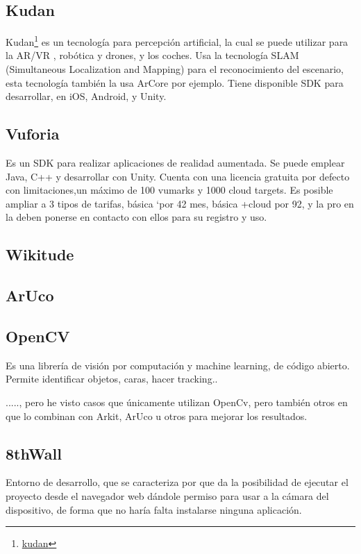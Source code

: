 \subsection{Kudan} Kudan\footnote{\href{https://www.xlsoft.com/en/products/kudan/?utm_source=google&utm_medium=adwords&utm_campaign=cp01&gclid=Cj0KCQiAvJXxBRCeARIsAMSkAprma7nGzsXVWd9w5H4HSQzNoOkF2eJu8LzAtEXbaDALYPUdfBOOgpEaAoqoEALw_wcB}{kudan}} es un tecnología para percepción artificial, la cual se puede utilizar para la AR/VR , robótica y drones, y los coches.
Usa la tecnología SLAM (Simultaneous Localization and Mapping) para el reconocimiento del escenario, esta tecnología también la usa ArCore por ejemplo.
Tiene disponible SDK para desarrollar, en iOS, Android, y Unity.

\subsection{Vuforia}
Es un SDK para realizar aplicaciones de realidad aumentada. Se puede emplear Java, C++ y desarrollar con Unity.
Cuenta con una licencia gratuita por defecto con limitaciones,un máximo de 100 vumarks y 1000 cloud targets.
Es posible ampliar a 3 tipos de tarifas, básica `por 42 mes, básica +cloud por 92, y la pro en la deben ponerse en contacto con ellos para su registro y uso.


\subsection{Wikitude}


\subsection{ArUco}


\subsection{OpenCV}
Es una librería de visión por computación y machine learning, de código abierto. Permite identificar objetos, caras, hacer tracking..

....., pero he visto casos que únicamente utilizan OpenCv, pero también otros en que lo combinan con Arkit, ArUco u otros para mejorar los resultados.


\subsection{8thWall}
Entorno de desarrollo, que se caracteriza por que da la posibilidad de ejecutar el proyecto desde el navegador web dándole permiso para usar a la cámara del dispositivo, de forma que no haría falta instalarse ninguna aplicación.




